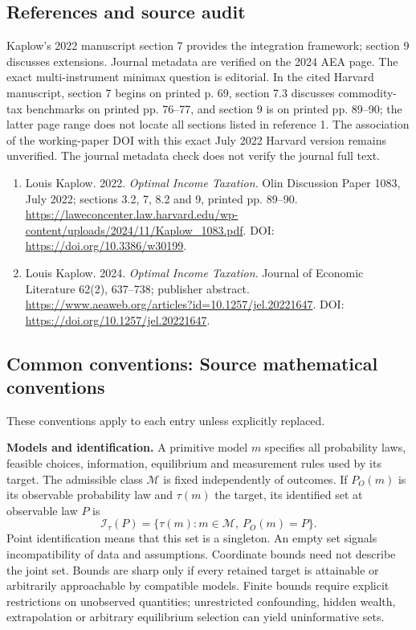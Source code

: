 \documentclass[11pt,a4paper]{article}
\begin{document}
\subsection*{References and source audit}
Kaplow's 2022 manuscript section 7 provides the integration framework; section 9 discusses extensions. Journal metadata are verified on the 2024 AEA page. The exact multi-instrument minimax question is editorial. In the cited Harvard manuscript, section 7 begins on printed p. 69, section 7.3 discusses commodity-tax benchmarks on printed pp. 76--77, and section 9 is on printed pp. 89--90; the latter page range does not locate all sections listed in reference 1. The association of the working-paper DOI with this exact July 2022 Harvard version remains unverified. The journal metadata check does not verify the journal full text.
\begin{enumerate}\raggedright
\item\hypertarget{definitions:source:30007753:1}{} Louis Kaplow. 2022. \emph{Optimal Income Taxation}. Olin Discussion Paper 1083, July 2022; sections 3.2, 7, 8.2 and 9, printed pp. 89–90.
\url{https://laweconcenter.law.harvard.edu/wp-content/uploads/2024/11/Kaplow_1083.pdf}.
DOI: \url{https://doi.org/10.3386/w30199}.
\item\hypertarget{definitions:source:30007753:2}{} Louis Kaplow. 2024. \emph{Optimal Income Taxation}. Journal of Economic Literature 62(2), 637–738; publisher abstract.
\url{https://www.aeaweb.org/articles?id=10.1257/jel.20221647}.
DOI: \url{https://doi.org/10.1257/jel.20221647}.
\end{enumerate}

\subsection*{Common conventions: Source mathematical conventions}

These conventions apply to each entry unless explicitly replaced.

\textbf{Models and identification.} A primitive model \(m\) specifies all probability laws, feasible choices, information, equilibrium and measurement rules used by its target. The admissible class \(\mathcal M\) is fixed independently of outcomes. If \(P_O(m)\) is its observable probability law and \(\tau(m)\) the target, its identified set at observable law \(P\) is
\[
 \mathcal I_\tau(P)=\{\tau(m):m\in\mathcal M,\ P_O(m)=P\}.
\]
Point identification means that this set is a singleton. An empty set signals incompatibility of data and assumptions. Coordinate bounds need not describe the joint set. Bounds are sharp only if every retained target is attainable or arbitrarily approachable by compatible models. Finite bounds require explicit restrictions on unobserved quantities; unrestricted confounding, hidden wealth, extrapolation or arbitrary equilibrium selection can yield uninformative sets.
\end{document}
